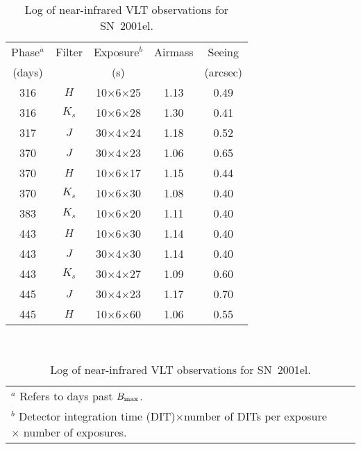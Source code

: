 \documentclass{aa}
\begin{document}
\setcounter{table}{2}
\begin{table}
\caption{Log of near-infrared VLT observations for SN~2001el.}
\label{table:3}
\centering
\begin{tabular}{ccccc}
\hline\hline
Phase$^{a}$ & Filter & Exposure$^b$ & Airmass & Seeing  \\
(days)      &        & (s)      &         & (arcsec) \\
\hline
316        & $H$     &   10$\times$6$\times$25 & 1.13 & 0.49 \\
316  & $K_{s}$ &   10$\times$6$\times$28 & 1.30 & 0.41 \\
317        & $J$     &   30$\times$4$\times$24 & 1.18 & 0.52 \\
370        & $J$     &   30$\times$4$\times$23 & 1.06 & 0.65 \\
370        & $H$     &   10$\times$6$\times$17 & 1.15 & 0.44 \\
370        & $K_{s}$ &   10$\times$6$\times$30 & 1.08 & 0.40 \\
383        & $K_{s}$ &   10$\times$6$\times$20 & 1.11 & 0.40 \\
443        & $H$     &   10$\times$6$\times$30 & 1.14 & 0.40  \\
443        & $J$ &   30$\times$4$\times$30 & 1.14 & 0.40 \\
443  & $K_{s}$ &   30$\times$4$\times$27 & 1.09  & 0.60  \\
445        & $J$ &   30$\times$4$\times$23 & 1.17 & 0.70 \\
445        & $H$     &   10$\times$6$\times$60 & 1.06 & 0.55 \\
\hline
\end{tabular} \\
\begin{tabular}{lll}
$^a$ Refers to days past $B_{\rm max}$. && \\
$^b$ Detector integration time (DIT)$\times$number of DITs per exposure$\times$
number of exposures. && \\
\end{tabular}
\end{table}
\clearpage
\end{document}
